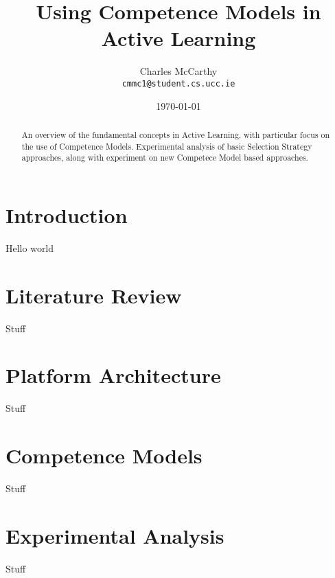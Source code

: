 \documentclass{article}
\begin{document}
\title{Using Competence Models in Active Learning}
\author{Charles McCarthy\\
  \texttt{cmmc1@student.cs.ucc.ie}}
\date{\today}
\maketitle

\begin{abstract}
An overview of the fundamental concepts in Active Learning, with particular focus on the use of Competence Models. Experimental analysis of basic Selection Strategy approaches, along with experiment on new Competece Model based approaches.
\end{abstract}

\section{Introduction}
Hello world

\section{Literature Review}
Stuff

\section{Platform Architecture}
Stuff

\section{Competence Models}
Stuff

\section{Experimental Analysis}
Stuff \cite{Hu2009}



\end{document}
